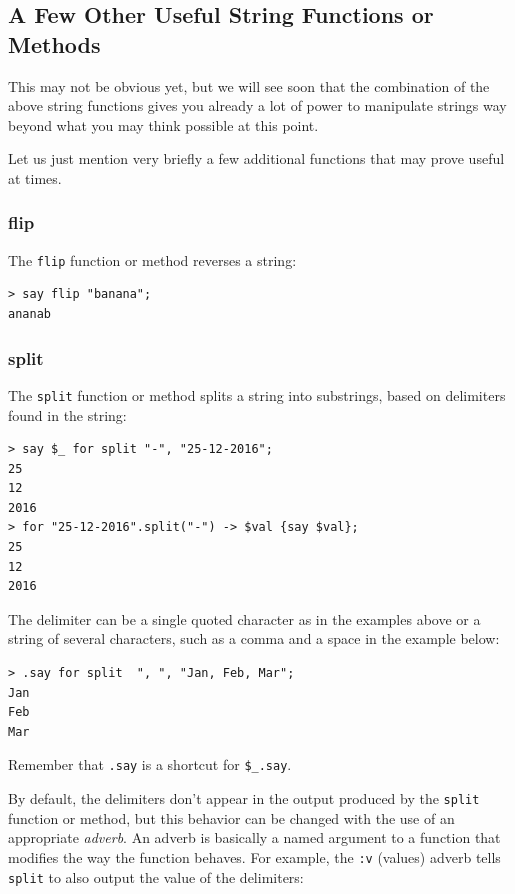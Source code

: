 
\subsection{A Few Other Useful String Functions or Methods}

This may not be obvious yet, but we will see soon 
that the combination of the above string functions gives you 
already a lot of power to manipulate strings way beyond what 
you may think possible at this point.

Let us just mention very briefly a few additional functions 
that may prove useful at times.

\subsubsection{flip}

The {\tt flip} function or method reverses a string:

\begin{verbatim}
> say flip "banana";
ananab
\end{verbatim}
%

\subsubsection{split}
The {\tt split} function or method splits a string 
into substrings, based on delimiters found in the string:

\begin{verbatim}
> say $_ for split "-", "25-12-2016";
25
12
2016
> for "25-12-2016".split("-") -> $val {say $val};
25
12
2016
\end{verbatim}

The delimiter can be a single quoted character as in the 
examples above or a string of several characters, such as 
a comma and a space in the example below:

\begin{verbatim}
> .say for split  ", ", "Jan, Feb, Mar";
Jan
Feb
Mar
\end{verbatim}

Remember that \verb'.say' is a shortcut for \verb'$_.say'.

By default, the delimiters don't appear in the output produced 
by the {\tt split} function or method, but this behavior can 
be changed with the use of an appropriate \emph{adverb}. An adverb 
is basically a named argument to a function that modifies 
the way the function behaves. For example, the {\tt :v} (values) adverb 
tells {\tt split} to also output the value of the delimiters:

